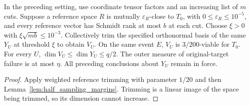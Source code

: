 \begin{theorem}
    \label{thm:half_sampling_original_reference_trim}
    \leanok
    In the preceding setting, use coordinate tensor factors and an increasing
    list of $m$ cuts. Suppose a reference space $R$ is mutually
    $\varepsilon_R$-close to $T_0$, with $0\le\varepsilon_R\le10^{-5}$,
    and every reference vector has Schmidt rank at most $b$ at each cut.
    Choose $\xi>0$ with $\xi\sqrt{mb}\le10^{-3}$.
    Collectively trim the specified orthonormal basis of the same $Y_U$
    at threshold $\xi$ to obtain $V_U$.
    On the same event $E$, $V_U$ is $3/200$-viable for $T_0$.
    For every $U$, $\dim V_U\le\dim Y_U\le q/2$.
    The outer measure of original-target failure is at most $\eta$.
    All preceding conclusions about $Y_U$ remain in force.
\end{theorem}
\begin{proof}\leanok
    Apply weighted reference trimming with parameter $1/20$ and then
    Lemma~\ref{lem:half_sampling_margins}. Trimming is a linear image of
    the space being trimmed, so its dimension cannot increase.
\end{proof}

